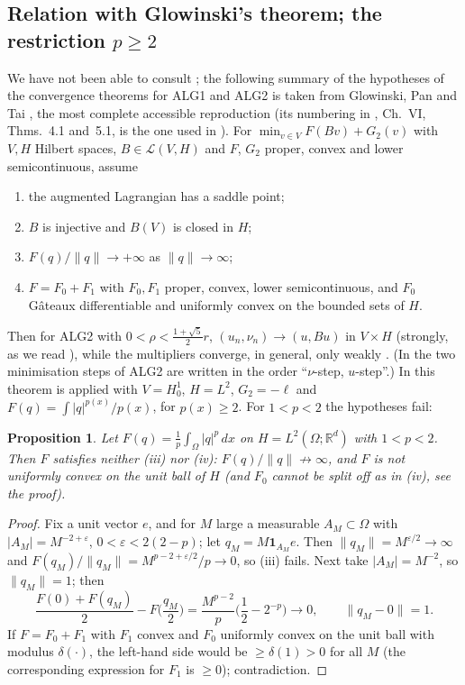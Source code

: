 \documentclass[11pt]{amsart}
\newtheorem{proposition}[theorem]{Proposition}
\theoremstyle{definition}
\theoremstyle{remark}
\numberwithin{equation}{section}
\newcommand{\R}{\mathbb{R}}
\newcommand{\dx}{\,dx}
\newcommand{\abs}[1]{\lvert #1\rvert}
\newcommand{\norm}[1]{\lVert #1\rVert}
\begin{document}
\subsection{\texorpdfstring{Relation with Glowinski's theorem; the restriction $p\ge2$}{Relation with Glowinski's theorem; the restriction p>=2}}\label{ssec:glowinski}
We have not been able to consult \cite{Glowinski1984ChVI}; the following summary of the hypotheses of the convergence theorems for ALG1 and ALG2 is taken from Glowinski, Pan and Tai \cite[\S3.2]{GlowinskiPanTai2016}, the most complete accessible reproduction (its numbering in \cite{Glowinski1984ChVI}, Ch.~VI, Thms.~4.1 and~5.1, is the one used in \cite{AragonFBRubio2023,DelPezzoMartinez2014DCM}). For $\min_{v\in V}F(Bv)+G_2(v)$ with $V,H$ Hilbert spaces, $B\in\mathcal L(V,H)$ and $F$, $G_2$ proper, convex and lower semicontinuous, assume
\begin{enumerate}[label=(\roman*),leftmargin=2em]
\item the augmented Lagrangian has a saddle point;
\item $B$ is injective and $B(V)$ is closed in $H$;
\item $F(q)/\norm q\to+\infty$ as $\norm q\to\infty$;
\item $F=F_0+F_1$ with $F_0,F_1$ proper, convex, lower semicontinuous, and $F_0$ G\^ateaux differentiable and uniformly convex on the bounded sets of $H$.
\end{enumerate}
Then for ALG2 with $0<\rho<\frac{1+\sqrt5}2r$, $(u_n,\nu_n)\to(u,Bu)$ in $V\times H$ (strongly, as we read \cite{GlowinskiPanTai2016}), while the multipliers converge, in general, only weakly \cite{GlowinskiPanTai2016}. (In \cite{GlowinskiPanTai2016} the two minimisation steps of ALG2 are written in the order ``$\nu$-step, $u$-step''.) In \cite[Thm.~4.3]{AragonFBRubio2023} this theorem is applied with $V=H^1_0$, $H=L^2$, $G_2=-\ell$ and $F(q)=\int\abs q^{p(x)}/p(x)$, for $p(x)\ge2$. For $1<p<2$ the hypotheses fail:

\begin{proposition}\label{prop:glowinski-pless2}
Let $F(q)=\frac1p\int_\Omega\abs q^p\dx$ on $H=L^2(\Omega;\R^d)$ with $1<p<2$. Then $F$ satisfies neither \textup{(iii)} nor \textup{(iv)}: $F(q)/\norm q\not\to\infty$, and $F$ is not uniformly convex on the unit ball of $H$ \textup(and $F_0$ cannot be split off as in \textup{(iv)}, see the proof\textup).
\end{proposition}
\begin{proof}
Fix a unit vector $e$, and for $M$ large a measurable $A_M\subset\Omega$ with $\abs{A_M}=M^{-2+\varepsilon}$, $0<\varepsilon<2(2-p)$; let $q_M=M\mathbf 1_{A_M}e$. Then $\norm{q_M}=M^{\varepsilon/2}\to\infty$ and $F(q_M)/\norm{q_M}=M^{p-2+\varepsilon/2}/p\to0$, so (iii) fails. Next take $\abs{A_M}=M^{-2}$, so $\norm{q_M}=1$; then
\[
\frac{F(0)+F(q_M)}2-F\Big(\frac{q_M}2\Big)=\frac{M^{p-2}}p\Big(\frac12-2^{-p}\Big)\to0,\qquad\norm{q_M-0}=1 .
\]
If $F=F_0+F_1$ with $F_1$ convex and $F_0$ uniformly convex on the unit ball with modulus $\delta(\cdot)$, the left-hand side would be $\ge\delta(1)>0$ for all $M$ (the corresponding expression for $F_1$ is $\ge0$); contradiction.
\end{proof}
\end{document}
